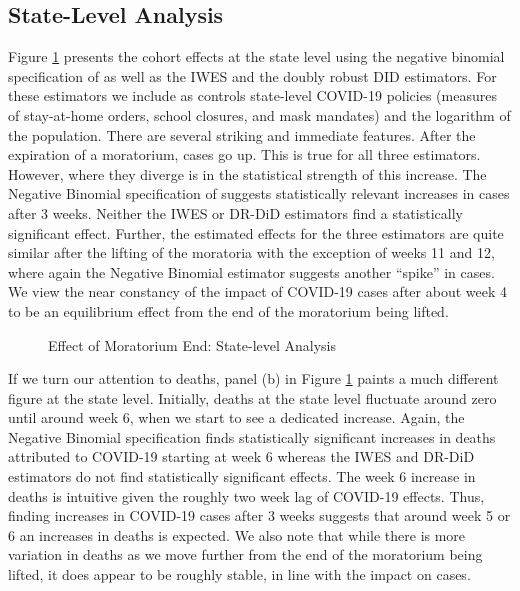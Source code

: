 \documentclass[12pt]{amsart}
\begin{document}
\subsection{State-Level Analysis}

Figure \ref{fig:STATEmain} presents the cohort effects at the state level using the negative binomial specification of  as well as the IWES and the doubly robust DID estimators. For these estimators we include as controls state-level COVID-19 policies (measures of stay-at-home orders, school closures, and mask mandates) and the logarithm of the population. There are several striking and immediate features. After the expiration of a moratorium, cases go up. This is true for all three estimators. However, where they diverge is in the statistical strength of this increase. The Negative Binomial specification of  suggests statistically relevant increases in cases after 3 weeks. Neither the IWES or DR-DiD estimators find a statistically significant effect. Further, the estimated effects for the three estimators are quite similar after the lifting of the moratoria with the exception of weeks 11 and 12, where again the Negative Binomial estimator suggests another ``spike'' in cases. We view the near constancy of the impact of COVID-19 cases after about week 4 to be an equilibrium effect from the end of the moratorium being lifted. 

\begin{figure}[h]
    \caption{Effect of Moratorium End: State-level Analysis}
    \centering     %
{\footnotesize \justifying {} \par}
\label{fig:STATEmain}
\end{figure}

If we turn our attention to deaths, panel (b) in Figure \ref{fig:STATEmain} paints a much different figure at the state level. Initially, deaths at the state level fluctuate around zero until around week 6, when we start to see a dedicated increase. Again, the Negative Binomial specification finds statistically significant increases in deaths attributed to COVID-19 starting at week 6 whereas the IWES and DR-DiD estimators do not find statistically significant effects. The week 6 increase in deaths is intuitive given the roughly two week lag of COVID-19 effects. Thus, finding increases in COVID-19 cases after 3 weeks suggests that around week 5 or 6 an increases in deaths is expected. We also note that while there is more variation in deaths as we move further from the end of the moratorium being lifted, it does appear to be roughly stable, in line with the impact on cases. 
\end{document}
